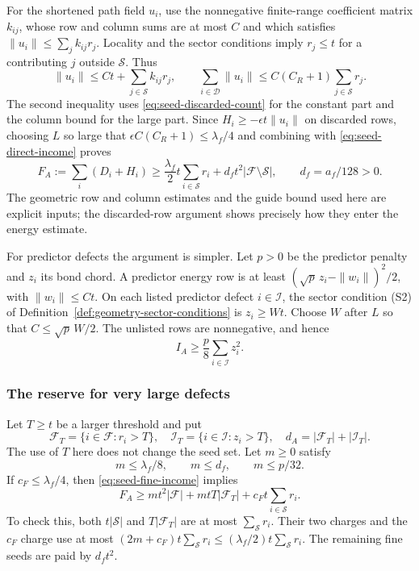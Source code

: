 For the shortened path field $u_i$, use the nonnegative finite-range
coefficient matrix $k_{ij}$, whose row and column sums are at most
$C$ and which satisfies $\|u_i\|\le\sum_j k_{ij}r_j$.
Locality and the sector conditions imply $r_j\le t$ for a contributing
$j$ outside $\mathcal S$. Thus
\[
 \|u_i\|\le Ct+\sum_{j\in\mathcal S}k_{ij}r_j,
 \qquad
 \sum_{i\in\mathcal D}\|u_i\|
       \le C(C_R+1)\sum_{j\in\mathcal S}r_j.
\]
The second inequality uses \eqref{eq:seed-discarded-count} for the
constant part and the column bound for the large part. Since
$H_i\ge-\epsilon t\|u_i\|$ on discarded rows, choosing $L$ so large
that $\epsilon C(C_R+1)\le\lambda_f/4$ and combining with
\eqref{eq:seed-direct-income} proves
\begin{equation}\label{eq:seed-fine-income}
 F_A:=\sum_i(D_i+H_i)
 \ge \frac{\lambda_f}{2}t\sum_{i\in\mathcal S}r_i
             +d_f t^2|\mathcal F\setminus\mathcal S|,
 \qquad d_f=a_f/128>0.
\end{equation}
The geometric row and column estimates and the guide bound used here
are explicit inputs; the discarded-row argument shows precisely how
they enter the energy estimate.

For predictor defects the argument is simpler. Let $p>0$ be the
predictor penalty and $z_i$ its bond chord. A predictor energy row is
at least $(\sqrt p\,z_i-\|w_i\|)^2/2$, with $\|w_i\|\le Ct$.
On each listed predictor defect $i\in\mathcal I$, the sector condition
(S2) of Definition~\ref{def:geometry-sector-conditions} is $z_i\ge Wt$. Choose $W$ after $L$ so that $C\le\sqrt p\,W/2$.
The unlisted rows are nonnegative, and hence
\begin{equation}\label{eq:seed-predictor-income}
 I_A\ge \frac{p}{8}\sum_{i\in\mathcal I}z_i^2.
\end{equation}

\subsubsection{The reserve for very large defects}
Let $T\ge t$ be a larger threshold and put
\[
 \mathcal F_T=\{i\in\mathcal F:r_i>T\},\quad
 \mathcal I_T=\{i\in\mathcal I:z_i>T\},\quad
 d_A=|\mathcal F_T|+|\mathcal I_T|.
\]
The use of $T$ here does not change the seed set. Let $m\ge0$ satisfy
\[
 m\le\lambda_f/8,\qquad m\le d_f,\qquad m\le p/32.
\]
If $c_F\le\lambda_f/4$, then \eqref{eq:seed-fine-income} implies
\begin{equation}\label{eq:seed-fine-reserve}
 F_A\ge mt^2|\mathcal F|+mtT|\mathcal F_T|
                     +c_Ft\sum_{i\in\mathcal S}r_i.
\end{equation}
To check this, both $t|\mathcal S|$ and $T|\mathcal F_T|$ are at
most $\sum_{\mathcal S}r_i$. Their two charges and the $c_F$ charge
use at most $(2m+c_F)t\sum_{\mathcal S}r_i\le
(\lambda_f/2)t\sum_{\mathcal S}r_i$. The remaining fine seeds are
paid by $d_ft^2$.

